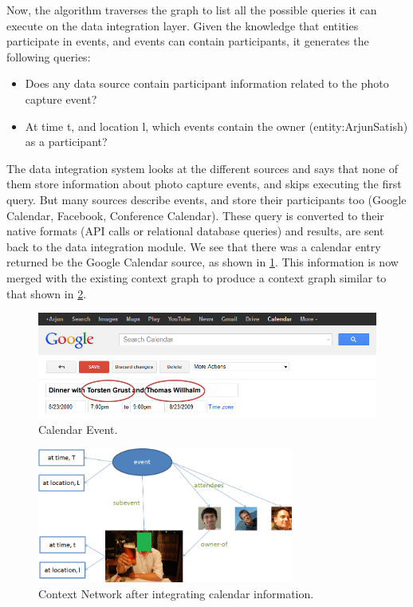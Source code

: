Now, the algorithm traverses the graph to list all the possible queries it can execute on the data integration layer. Given the knowledge that entities participate in events, and events can contain participants, it generates the following queries:

\begin{itemize}
\item Does any data source contain participant information related to the photo capture event?
\item At time t, and location l, which events contain the owner (entity:ArjunSatish) as a participant?
\end{itemize}

The data integration system looks at the different sources and says that none of them store information about photo capture events, and skips executing the first query. But many sources describe events, and store their participants too (Google Calendar, Facebook, Conference Calendar). These query is converted to their native formats (API calls or relational database queries) and results, are sent back to the data integration module. We see that there was a calendar entry returned be the Google Calendar source, as shown in \ref{fig:stacktrace-simple-calendar}. This information is now merged with the existing context graph to produce a context graph similar to that shown in \ref{fig:stacktrace-simple-context-network}.

\begin{figure}[h]
\centering
\includegraphics[width=\textwidth]{media/chapter4/stacktrace/calendar.png}
\caption{Calendar Event.}
\label{fig:stacktrace-simple-calendar}
\end{figure}

\begin{figure}[h]
\centering
\includegraphics[width=0.75\textwidth]{media/chapter4/stacktrace/context-network-torsten.png}
\caption{Context Network after integrating calendar information.}
\label{fig:stacktrace-simple-context-network}
\end{figure}

